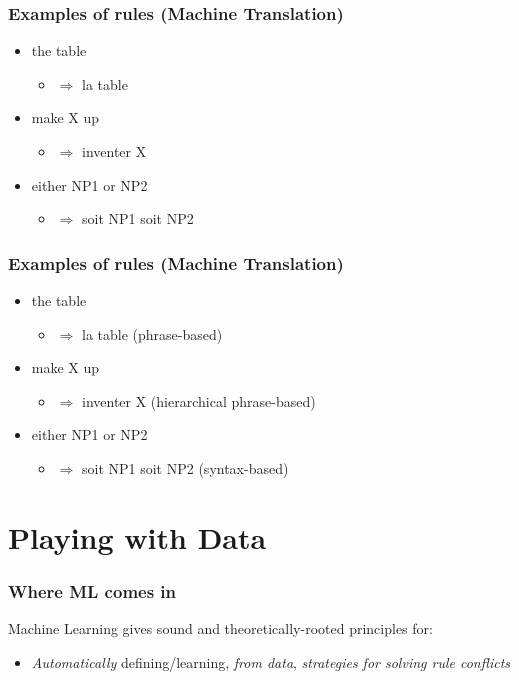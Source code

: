 \documentclass[usenames,dvipsnames]{beamer}
\newcommand{\voc}[1]{\emph{\color{ForestGreen}#1}}
\begin{document}
\begin{frame}\frametitle{Examples of rules (Machine Translation)}

\begin{itemize}
\item the table
\begin{itemize}
\item $\Rightarrow$ la table
\end{itemize}
\item make X up 
\begin{itemize}
\item $\Rightarrow$ inventer X
\end{itemize}
\item either NP1 or NP2
\begin{itemize}
\item $\Rightarrow$ soit NP1 soit NP2
\end{itemize}
\end{itemize}
\end{frame}

\begin{frame}\frametitle{Examples of rules (Machine Translation)}

\begin{itemize}
\item the table
\begin{itemize}
\item $\Rightarrow$ la table (phrase-based)
\end{itemize}
\item make X up 
\begin{itemize}
\item $\Rightarrow$ inventer X (hierarchical phrase-based)
\end{itemize}
\item either NP1 or NP2
\begin{itemize}
\item $\Rightarrow$ soit NP1 soit NP2 (syntax-based)
\end{itemize}
\end{itemize}
\end{frame}

\section{Playing with Data}

\begin{frame}\frametitle{Where ML comes in}

\begin{block}{Machine Learning gives sound and theoretically-rooted principles for:}
\begin{itemize}
\item \emph{Automatically} defining/learning, \voc{from data}, \voc{strategies for solving rule conflicts}
\end{itemize}
\end{block}

\end{frame}
\end{document}
